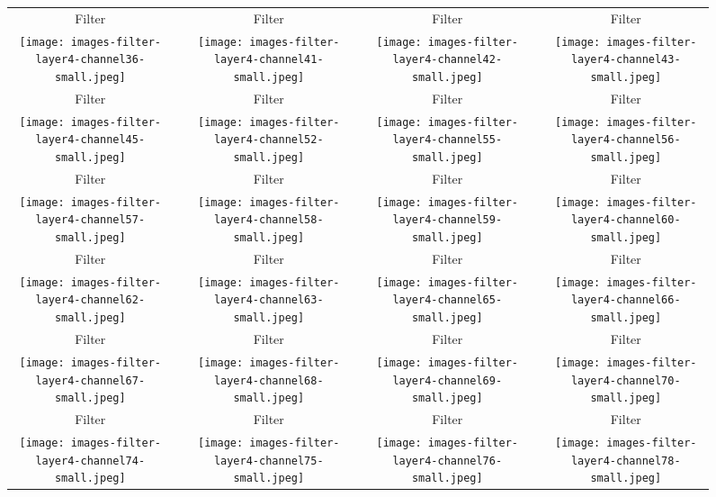 \documentclass[runningheads]{llncs}
\begin{document}
\begin{figure}[t]
\centering
\begin{tabular}{ccccccc}
Filter  && Filter  && Filter  && Filter 
\\
\texttt{[image: images-filter-layer4-channel36-small.jpeg]}&&
\texttt{[image: images-filter-layer4-channel41-small.jpeg]}&&
\texttt{[image: images-filter-layer4-channel42-small.jpeg]}&&
\texttt{[image: images-filter-layer4-channel43-small.jpeg]}
\\
Filter  && Filter  && Filter  && Filter 
\\
\texttt{[image: images-filter-layer4-channel45-small.jpeg]}&&
\texttt{[image: images-filter-layer4-channel52-small.jpeg]}&&
\texttt{[image: images-filter-layer4-channel55-small.jpeg]}&&
\texttt{[image: images-filter-layer4-channel56-small.jpeg]}
\\
Filter  && Filter  && Filter  && Filter 
\\
\texttt{[image: images-filter-layer4-channel57-small.jpeg]}&&
\texttt{[image: images-filter-layer4-channel58-small.jpeg]}&&
\texttt{[image: images-filter-layer4-channel59-small.jpeg]}&&
\texttt{[image: images-filter-layer4-channel60-small.jpeg]}
\\
Filter  && Filter  && Filter  && Filter 
\\
\texttt{[image: images-filter-layer4-channel62-small.jpeg]}&&
\texttt{[image: images-filter-layer4-channel63-small.jpeg]}&&
\texttt{[image: images-filter-layer4-channel65-small.jpeg]}&&
\texttt{[image: images-filter-layer4-channel66-small.jpeg]}
\\
Filter  && Filter  && Filter  && Filter 
\\
\texttt{[image: images-filter-layer4-channel67-small.jpeg]}&&
\texttt{[image: images-filter-layer4-channel68-small.jpeg]}&&
\texttt{[image: images-filter-layer4-channel69-small.jpeg]}&&
\texttt{[image: images-filter-layer4-channel70-small.jpeg]}
\\
Filter  && Filter  && Filter  && Filter 
\\
\texttt{[image: images-filter-layer4-channel74-small.jpeg]}&&
\texttt{[image: images-filter-layer4-channel75-small.jpeg]}&&
\texttt{[image: images-filter-layer4-channel76-small.jpeg]}&&
\texttt{[image: images-filter-layer4-channel78-small.jpeg]}
\end{tabular}
\end{figure}
\end{document}
